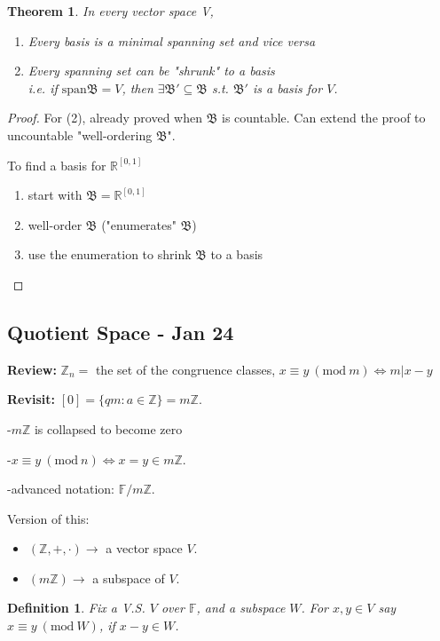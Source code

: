 \documentclass[12pt]{article}
\newtheorem{theorem}{Theorem}[subsection]
\newtheorem{definition}{Definition}[subsection]
\newcommand{\Span}{\mathrm{span}}
\newcommand{\mR}{{\mathbb{R}}}
\newcommand{\mZ}{{\mathbb{Z}}}
\newcommand{\mF}{{\mathbb{F}}}
\newcommand{\Mod}[1]{\ (\mathrm{mod}\ #1)}
\begin{document}
	\begin{theorem}
		In every vector space V, 
		\begin{enumerate}
			\item Every basis is a minimal spanning set and vice versa
			\item Every spanning set can be "shrunk" to a basis\\
				i.e. if $\Span\mathfrak{B} = V$, then $\exists \mathfrak{B}'
				\subseteq \mathfrak{B}$ s.t. $\mathfrak{B}'$ is a basis for 
				$V$. 
		\end{enumerate}
	\end{theorem}
	\begin{proof}
		For (2), already proved when $\mathfrak{B}$ is countable. 
		Can extend the proof to uncountable "well-ordering $\mathfrak{B}$".

		To find a basis for $\mR^{[0,1]}$
		\begin{enumerate}
			\item start with $\mathfrak{B} = \mR^{[0,1]}$
			\item well-order $\mathfrak{B}$ ("enumerates" $\mathfrak{B}$)
			\item use the enumeration to shrink $\mathfrak{B}$ to a basis\\
		\end{enumerate}
	\end{proof}


	\newpage
	\subsection{Quotient Space - Jan 24}
	{\color{OliveGreen}\textbf{Review: } 
	$\mZ_n =$ the set of the congruence classes, 
	$x \equiv y \Mod m \iff m \vert x-y$

	\textbf{Revisit: } $[0] = \{qm : a \in \mZ\} = m\mZ$. 

	-$m\mZ$ is collapsed to become zero

	-$x \equiv y \Mod n \iff x = y \in m\mZ$.

	-advanced notation: $\mF/m\mZ$. 

	Version of this: 
	\begin{itemize}
		\item $(\mZ, +, \cdot) \to$ a vector space $V$.
		\item $(m\mZ) \to$ a subspace of $V$.\\
	\end{itemize}
	}

	\begin{definition}
		Fix a V.S. $V$ over $\mF$, and a subspace $W$. 
		For $x, y \in V$ say $x \equiv y \Mod W$, if $x - y \in W$. \\
	\end{definition}
\end{document}
